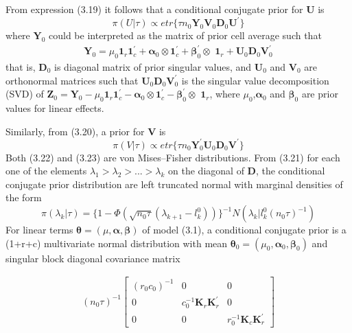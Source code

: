 From expression (3.19) it follows that a conditional conjugate prior for \textbf{U} is
\begin{equation}
	\pi(U|\tau)\varpropto etr \{\tau n_0 \textbf{Y}_0\textbf{V}_0 \textbf{D}_0 \textbf{U}^\prime\}
\end{equation}
where $\textbf{Y}_0$ could be interpreted as the matrix of prior cell average such that
\begin{eqnarray}
	\textbf{Y}_0=\mu_0\textbf{1}_r\textbf{1}_c^\prime+\bm{\alpha}_0\otimes \textbf{1}_c^\prime+\bm{\beta}_0^\prime\otimes\textbf{ 1}_r+\textbf{U}_0\textbf{D}_0\textbf{V}_0^\prime \nonumber
\end{eqnarray}
that is, $\textbf{D}_0$ is diagonal matrix of prior singular values, and $\textbf{U}_0$ and $\textbf{V}_0$ are orthonormal matrices such that $\textbf{U}_0\textbf{D}_0\textbf{V}_0^\prime$ is the singular value decomposition (SVD) of $\textbf{Z}_0=\textbf{Y}_0-\mu_0\textbf{1}_r\textbf{1}_c^\prime-\bm{\alpha}_0\otimes \textbf{1}_c^\prime-\bm{\beta}_0^\prime\otimes\textbf{ 1}_r$, where $\mu_0$,$\bm{\alpha}_0$ and $\bm{\beta}_0$ are prior values for linear effects.

Similarly, from (3.20), a prior for \textbf{V} is
\begin{equation}
	\pi(V|\tau)\varpropto etr\{\tau n_0\textbf{Y}_0^\prime \textbf{U}_0 \textbf{D}_0\textbf{V}^\prime\}
\end{equation}
Both (3.22) and (3.23) are von Mises--Fisher distributions. From (3.21) for each one of the elements $\lambda_1 >\lambda_2 > . . . > \lambda_k$ on the diagonal of \textbf{D}, the conditional conjugate prior distribution are left truncated normal with marginal densities of the form
\begin{equation}
\pi (\lambda_k|\tau)=\{1-\Phi(\sqrt{n_0\tau}(\lambda_{k+1}-l_k^0))\}^{-1} N(\lambda_k|l_k^0(n_0\tau)^{-1})\end{equation}
For linear terms $\bm{\theta}=(\mu,\bm{\alpha},\bm{\beta})$ of model (3.1), a conditional conjugate prior is a (1+r+c) multivariate normal distribution with mean $\bm{\theta}_0=(\mu_0,\bm{\alpha}_0,\bm{\beta}_0)$ and singular block diagonal covariance matrix

\begin{eqnarray}
	(n_0\tau)^{-1}	\begin{bmatrix}
	(r_0c_0)^{-1} & 0 & 0 \\
	0 & c_0^{-1}\textbf{K}_r\textbf{K}_r^\prime & 0\\
	0 & 0 & r_0^{-1}\textbf{K}_c\textbf{K}_r^\prime
	\end{bmatrix} \nonumber
	\end{eqnarray}

